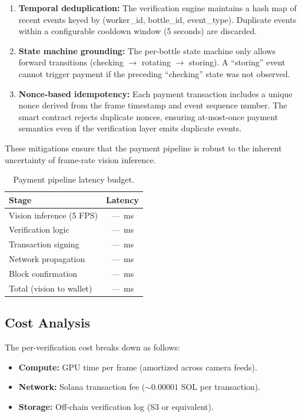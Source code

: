 \documentclass[10pt,twocolumn]{article}
\newcommand{\todo}{\textit{---}}
\newcommand{\popwres}{\todo}
\begin{document}
\begin{enumerate}[nosep]
\item \textbf{Temporal deduplication:} The verification engine maintains a hash map of recent events keyed by (worker\_id, bottle\_id, event\_type). Duplicate events within a configurable cooldown window (5 seconds) are discarded.
\item \textbf{State machine grounding:} The per-bottle state machine only allows forward transitions (checking $\rightarrow$ rotating $\rightarrow$ storing). A ``storing'' event cannot trigger payment if the preceding ``checking'' state was not observed.
\item \textbf{Nonce-based idempotency:} Each payment transaction includes a unique nonce derived from the frame timestamp and event sequence number. The smart contract rejects duplicate nonces, ensuring at-most-once payment semantics even if the verification layer emits duplicate events.
\end{enumerate}

These mitigations ensure that the payment pipeline is robust to the inherent uncertainty of frame-rate vision inference.

\begin{table}[htbp]
\centering
\small
\caption{Payment pipeline latency budget.}
\label{tab:payment-latency}
\begin{tabular}{l c}
\toprule
\textbf{Stage} & \textbf{Latency} \\
\midrule
Vision inference (5 FPS) & \popwres~ms \\
Verification logic & \popwres~ms \\
Transaction signing & \popwres~ms \\
Network propagation & \popwres~ms \\
Block confirmation & \popwres~ms \\
\midrule
Total (vision to wallet) & \popwres~ms \\
\bottomrule
\end{tabular}
\end{table}

\subsection{Cost Analysis}

The per-verification cost breaks down as follows:
\begin{itemize}[nosep]
\item \textbf{Compute:} GPU time per frame (amortized across camera feeds).
\item \textbf{Network:} Solana transaction fee ($\sim 0.00001$ SOL per transaction).
\item \textbf{Storage:} Off-chain verification log (S3 or equivalent).
\end{itemize}
\end{document}
